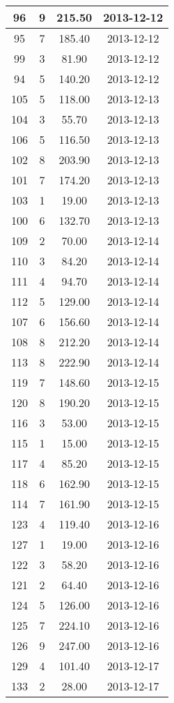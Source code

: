 \documentclass[a4paper,10pt]{report}
\begin{document}
\begin{longtable}{|c|c|c|c|}
96 &  9 &215.50 &2013-12-12\\ \hline
95 &  7 &185.40 &2013-12-12\\ \hline
99 &  3 & 81.90 &2013-12-12\\ \hline
94 &  5 &140.20 &2013-12-12\\ \hline
105&   5& 118.00& 2013-12-13\\ \hline
104&   3&  55.70& 2013-12-13\\ \hline
106&   5& 116.50& 2013-12-13\\ \hline
102&   8& 203.90& 2013-12-13\\ \hline
101&   7& 174.20& 2013-12-13\\ \hline
103&   1&  19.00& 2013-12-13\\ \hline
100&   6& 132.70& 2013-12-13\\ \hline
109&   2&  70.00& 2013-12-14\\ \hline
110&   3&  84.20& 2013-12-14\\ \hline
111&   4&  94.70& 2013-12-14\\ \hline
112&   5& 129.00& 2013-12-14\\ \hline
107&   6& 156.60& 2013-12-14\\ \hline
108&   8& 212.20& 2013-12-14\\ \hline
113&   8& 222.90& 2013-12-14\\ \hline
119&   7& 148.60& 2013-12-15\\ \hline
120&   8& 190.20& 2013-12-15\\ \hline
116&   3&  53.00& 2013-12-15\\ \hline
115&   1&  15.00& 2013-12-15\\ \hline
117&   4&  85.20& 2013-12-15\\ \hline
118&   6& 162.90& 2013-12-15\\ \hline
114&   7& 161.90& 2013-12-15\\ \hline
123&   4& 119.40& 2013-12-16\\ \hline
127&   1&  19.00& 2013-12-16\\ \hline
122&   3&  58.20& 2013-12-16\\ \hline
121&   2&  64.40& 2013-12-16\\ \hline
124&   5& 126.00& 2013-12-16\\ \hline
125&   7& 224.10& 2013-12-16\\ \hline
126&   9& 247.00& 2013-12-16\\ \hline
129&   4& 101.40& 2013-12-17\\ \hline
133&   2&  28.00& 2013-12-17\\ \hline

\end{longtable}
\end{document}
